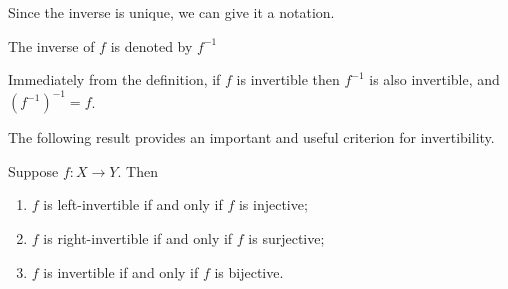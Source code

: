 Since the inverse is unique, we can give it a notation.

\begin{notation}
The inverse of $f$ is denoted by $f^{-1}$
\end{notation}

\begin{remark}
Immediately from the definition, if $f$ is invertible then $f^{-1}$ is also invertible, and $(f^{-1})^{-1}=f$.
\end{remark}

The following result provides an important and useful criterion for invertibility.

\begin{lemma}
Suppose $f\colon X\to Y$. Then
\begin{enumerate}[label=(\roman*)]
\item $f$ is left-invertible if and only if $f$ is injective;
\item $f$ is right-invertible if and only if $f$ is surjective;
\item $f$ is invertible if and only if $f$ is bijective.
\end{enumerate}
\end{lemma}

